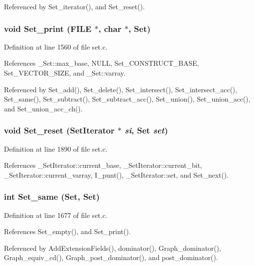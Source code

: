 Referenced by Set\_\-iterator(), and Set\_\-reset().
\subsubsection{\setlength{\rightskip}{0pt plus 5cm}void Set\_\-print (FILE $\ast$, char $\ast$, \bf{Set})}\label{set_8h_ea18132a076794f599d05a2633a48dc6}




Definition at line 1560 of file set.c.

References \_\-Set::max\_\-base, NULL, Set\_\-CONSTRUCT\_\-BASE, Set\_\-VECTOR\_\-SIZE, and \_\-Set::varray.

Referenced by Set\_\-add(), Set\_\-delete(), Set\_\-intersect(), Set\_\-intersect\_\-acc(), Set\_\-same(), Set\_\-subtract(), Set\_\-subtract\_\-acc(), Set\_\-union(), Set\_\-union\_\-acc(), and Set\_\-union\_\-acc\_\-ch().
\subsubsection{\setlength{\rightskip}{0pt plus 5cm}void Set\_\-reset (\bf{Set\-Iterator} $\ast$ {\em si}, \bf{Set} {\em set})}\label{set_8h_ae1fabcddf34263afd4a30dd1690f023}




Definition at line 1890 of file set.c.

References \_\-Set\-Iterator::current\_\-base, \_\-Set\-Iterator::current\_\-bit, \_\-Set\-Iterator::current\_\-varray, I\_\-punt(), \_\-Set\-Iterator::set, and Set\_\-next().
\subsubsection{\setlength{\rightskip}{0pt plus 5cm}int Set\_\-same (\bf{Set}, \bf{Set})}\label{set_8h_f6db9d7a26bf9d80912c74a187c65457}




Definition at line 1677 of file set.c.

References Set\_\-empty(), and Set\_\-print().

Referenced by Add\-Extension\-Fields(), dominator(), Graph\_\-dominator(), Graph\_\-equiv\_\-cd(), Graph\_\-post\_\-dominator(), and post\_\-dominator().
